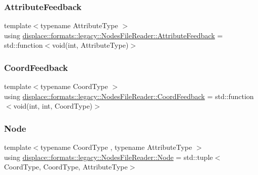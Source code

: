 \subsubsection{\texorpdfstring{AttributeFeedback}{AttributeFeedback}}
{\footnotesize\ttfamily template$<$typename Attribute\+Type $>$ \\
using \mbox{\hyperlink{classdisplace_1_1formats_1_1legacy_1_1_nodes_file_reader_aaace2a27c97ca3c31e9a177d4776afc8}{displace\+::formats\+::legacy\+::\+Nodes\+File\+Reader\+::\+Attribute\+Feedback}} =  std\+::function$<$void(int, Attribute\+Type)$>$}

\mbox{\label{classdisplace_1_1formats_1_1legacy_1_1_nodes_file_reader_afafb20437b7e3bf2a9b6c63c3eb030e3}} 
\subsubsection{\texorpdfstring{CoordFeedback}{CoordFeedback}}
{\footnotesize\ttfamily template$<$typename Coord\+Type $>$ \\
using \mbox{\hyperlink{classdisplace_1_1formats_1_1legacy_1_1_nodes_file_reader_afafb20437b7e3bf2a9b6c63c3eb030e3}{displace\+::formats\+::legacy\+::\+Nodes\+File\+Reader\+::\+Coord\+Feedback}} =  std\+::function$<$void(int, int, Coord\+Type)$>$}

\mbox{\label{classdisplace_1_1formats_1_1legacy_1_1_nodes_file_reader_a366283f07d187605ddd50f9ca7f9872a}} 
\subsubsection{\texorpdfstring{Node}{Node}}
{\footnotesize\ttfamily template$<$typename Coord\+Type , typename Attribute\+Type $>$ \\
using \mbox{\hyperlink{classdisplace_1_1formats_1_1legacy_1_1_nodes_file_reader_a366283f07d187605ddd50f9ca7f9872a}{displace\+::formats\+::legacy\+::\+Nodes\+File\+Reader\+::\+Node}} =  std\+::tuple$<$Coord\+Type, Coord\+Type, Attribute\+Type$>$}



